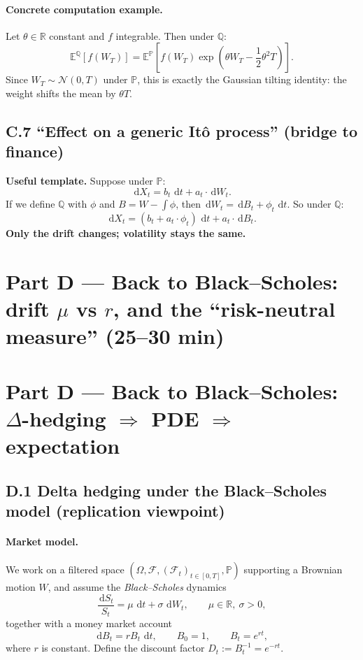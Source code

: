 \documentclass[11pt]{article}
\newcommand{\Pbb}{\mathbb{P}}
\newcommand{\Qbb}{\mathbb{Q}}
\newcommand{\E}{\mathbb{E}}
\newcommand{\R}{\mathbb{R}}
\newcommand{\dd}{\,\mathrm{d}}
\newcommand{\1}{\mathbf{1}}
\begin{document}
\paragraph{Concrete computation example.}
Let $\theta\in\R$ constant and $f$ integrable. Then under $\Qbb$:
\[
\E^{\Qbb}[f(W_T)]
=
\E^{\Pbb}\!\left[
f(W_T)\exp\!\left(\theta W_T-\frac12\theta^2T\right)
\right].
\]
Since $W_T\sim\mathcal N(0,T)$ under $\Pbb$, this is exactly the Gaussian tilting identity:
the weight shifts the mean by $\theta T$.

\subsection*{C.7 ``Effect on a generic It\^o process'' (bridge to finance)}


\textbf{Useful template.}
Suppose under $\Pbb$:
\[
\dd X_t = b_t\,\dd t + a_t\cdot \dd W_t.
\]
If we define $\Qbb$ with $\phi$ and $B=W-\int\phi$,
then $\dd W_t = \dd B_t + \phi_t\,\dd t$.
So under $\Qbb$:
\[
\dd X_t = (b_t+a_t\cdot \phi_t)\,\dd t + a_t\cdot \dd B_t.
\]
\textbf{Only the drift changes; volatility stays the same.}

\section*{Part D --- Back to Black--Scholes:
drift $\mu$ vs $r$, and the ``risk-neutral measure'' (25--30 min)}

\section*{Part D --- Back to Black--Scholes: \texorpdfstring{$\Delta$}{Delta}-hedging \texorpdfstring{$\Rightarrow$}{=>} PDE \texorpdfstring{$\Rightarrow$}{=>} expectation}

\subsection*{D.1 Delta hedging under the Black--Scholes model (replication viewpoint)}

\paragraph{Market model.}
We work on a filtered space $(\Omega,\mathcal F,(\mathcal F_t)_{t\in[0,T]},\Pbb)$ supporting
a Brownian motion $W$, and assume the \emph{Black--Scholes} dynamics
\[
\frac{\dd S_t}{S_t}=\mu\,\dd t+\sigma\,\dd W_t,
\qquad \mu\in\R,\ \sigma>0,
\]
together with a money market account
\[
\dd B_t=rB_t\,\dd t,
\qquad B_0=1,
\qquad B_t=e^{rt},
\]
where $r$ is constant. Define the discount factor $D_t:=B_t^{-1}=e^{-rt}$.
\end{document}
